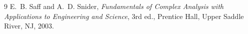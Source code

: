 \begin{thebibliography}{9}
   E.~B. Saff and A.~D. Snider,
    \emph{Fundamentals of Complex Analysis with Applications to Engineering
    and Science}, 3rd ed., Prentice Hall, Upper Saddle River, NJ, 2003.
\end{thebibliography}
